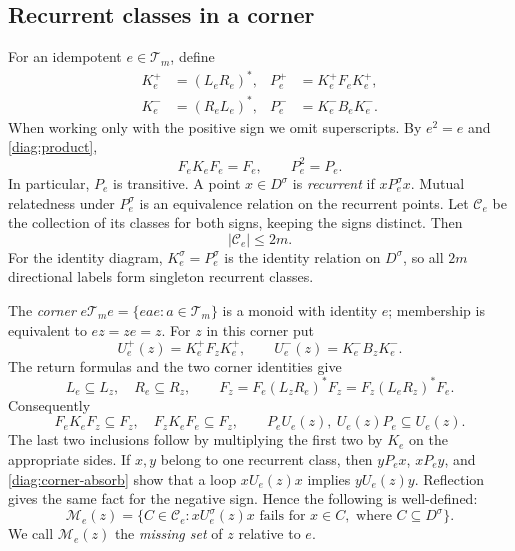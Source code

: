 \subsection{Recurrent classes in a corner}

For an idempotent $e\in\mathcal T_m$, define
\begin{equation}\label{diag:KP}
\begin{aligned}
 K_e^+&=(L_eR_e)^*,& P_e^+&=K_e^+F_eK_e^+,\\
 K_e^-&=(R_eL_e)^*,& P_e^-&=K_e^-B_eK_e^-.
\end{aligned}
\end{equation}
When working only with the positive sign we omit superscripts.
By $e^2=e$ and \eqref{diag:product},
\begin{equation}\label{diag:idempotent}
 F_eK_eF_e=F_e,\qquad P_e^2=P_e.
\end{equation}
In particular, $P_e$ is transitive. A point $x\in D^\sigma$ is
\emph{recurrent} if $xP_e^\sigma x$. Mutual relatedness under
$P_e^\sigma$ is an equivalence relation on the recurrent points.
Let $\mathcal C_e$ be the collection of its classes for both signs,
keeping the signs distinct. Then
\begin{equation}\label{diag:class-count}
 |\mathcal C_e|\le2m.
\end{equation}
For the identity diagram, $K_e^\sigma=P_e^\sigma$ is the identity
relation on $D^\sigma$, so all $2m$ directional labels form singleton
recurrent classes.

The \emph{corner} $e\mathcal T_me=\{eae:a\in\mathcal T_m\}$ is a monoid
with identity $e$; membership is equivalent to $ez=ze=z$.
For $z$ in this corner put
\[
 U_e^+(z)=K_e^+F_zK_e^+,\qquad
 U_e^-(z)=K_e^-B_zK_e^-.
\]
The return formulas and the two corner identities give
\begin{equation}\label{diag:corner}
 L_e\subseteq L_z,\quad R_e\subseteq R_z,\qquad
 F_z=F_e(L_zR_e)^*F_z=F_z(L_eR_z)^*F_e.
\end{equation}
Consequently
\begin{equation}\label{diag:corner-absorb}
 F_eK_eF_z\subseteq F_z,\quad F_zK_eF_e\subseteq F_z,
 \qquad P_eU_e(z),\ U_e(z)P_e\subseteq U_e(z).
\end{equation}
The last two inclusions follow by multiplying the first two by $K_e$
on the appropriate sides. If $x,y$ belong to one recurrent class, then
$yP_ex$, $xP_ey$, and \eqref{diag:corner-absorb} show that a loop
$xU_e(z)x$ implies $yU_e(z)y$. Reflection gives the same fact for the
negative sign. Hence the following is well-defined:
\[
 \mathcal M_e(z)=\{C\in\mathcal C_e:
       xU_e^\sigma(z)x\text{ fails for }x\in C,
       \text{ where }C\subseteq D^\sigma\}.
\]
We call $\mathcal M_e(z)$ the \emph{missing set} of $z$ relative to $e$.

